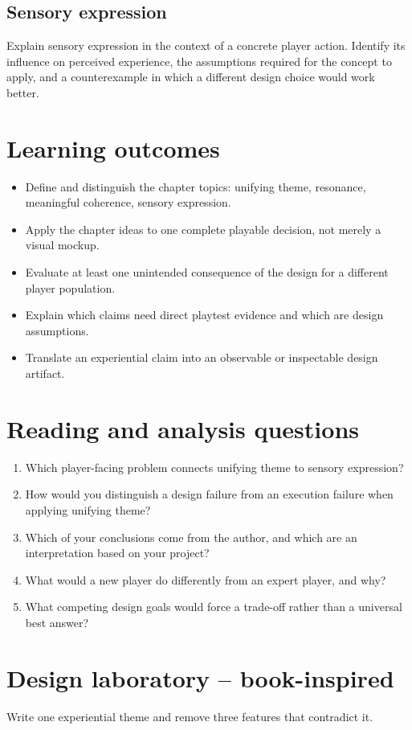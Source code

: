 \documentclass[11pt]{article}
\begin{document}
\subsection{Sensory expression}
Explain sensory expression in the context of a concrete player action. Identify its influence on perceived experience, the assumptions required for the concept to apply, and a counterexample in which a different design choice would work better.


\section{Learning outcomes}
\begin{itemize}
\item Define and distinguish the chapter topics: unifying theme, resonance, meaningful coherence, sensory expression.
\item Apply the chapter ideas to one complete playable decision, not merely a visual mockup.
\item Evaluate at least one unintended consequence of the design for a different player population.
\item Explain which claims need direct playtest evidence and which are design assumptions.
\item Translate an experiential claim into an observable or inspectable design artifact.
\end{itemize}

\section{Reading and analysis questions}
\begin{enumerate}
\item Which player-facing problem connects unifying theme to sensory expression?
\item How would you distinguish a design failure from an execution failure when applying unifying theme?
\item Which of your conclusions come from the author, and which are an interpretation based on your project?
\item What would a new player do differently from an expert player, and why?
\item What competing design goals would force a trade-off rather than a universal best answer?
\end{enumerate}

\section{Design laboratory -- book-inspired}
Write one experiential theme and remove three features that contradict it.
\end{document}
